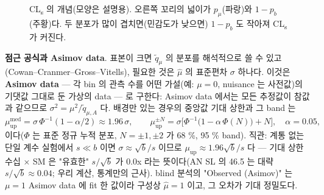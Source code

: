 \begin{figure}[htbp]
\centering
{}
\caption{CL\textsubscript{s} 의 개념(모양은 설명용). 오른쪽 꼬리의 넓이가 $p_\mu$(파랑)와 $1-p_b$(주황)다. 두 분포가 많이 겹치면(민감도가 낮으면) $1-p_b$ 도 작아져 CL\textsubscript{s} 가 커진다.}
\label{fig:stats-cls}
\end{figure}

\textbf{점근 공식과 Asimov data}. 표본이 크면 $\tilde q_\mu$ 의 분포를 해석적으로 쓸 수 있고(Cowan–Cranmer–Gross–Vitells), 필요한 것은 $\hat\mu$ 의 표준편차
$\sigma$ 하나다. 이것은 \textbf{Asimov data} — 각 bin 의 관측 수를 어떤 가설(예: $\mu=0$, nuisance 는 사전값)의 기댓값 그대로 둔 가상의 data — 로
구한다: Asimov data 에서는 모든 추정값이 참값과 같으므로 $\sigma^2=\mu^2/\tilde q_{\mu,A}$ 다. 배경만 있는 경우의 중앙값 기대 상한과 그 band 는
\begin{equation}
  \mu_{\mathrm{up}}^{\mathrm{med}}=\sigma\,\Phi^{-1}(1-\alpha/2)\approx1.96\,\sigma,\qquad
  \mu_{\mathrm{up}}^{\pm N}=\sigma\bigl[\Phi^{-1}\bigl(1-\alpha\,\Phi(N)\bigr)+N\bigr],\quad \alpha=0.05,
  \label{eq:stats-expected}
\end{equation}
이다($\Phi$ 는 표준 정규 누적 분포, $N=\pm1,\pm2$ 가 68 \%, 95 \% band). 직관: 계통 없는 단일 계수 실험에서 $s\ll b$ 이면 $\sigma\approx\sqrt{b}/s$ 이므로
$\mu_{\mathrm{up}}\approx1.96\sqrt{b}/s$ 다 — 기대 상한 수십 × SM 은 "유효한" $s/\sqrt{b}$ 가 0.0x 라는 뜻이다(AN SL 의 46.5 는 대략 $s/\sqrt b\approx0.04$; 우리 계산,
통계만의 근사). blind 분석의 "Observed (Asimov)" 는 $\mu=1$ Asimov data 에 fit 한 값이라 구성상 $\hat\mu=1$ 이고, 그 오차가 기대 정밀도다.

